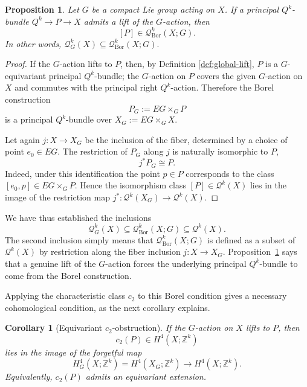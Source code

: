 \documentclass[11pt,a4paper]{article}
\numberwithin{equation}{section}
\newtheorem{prop}[definition]{Proposition}
\newtheorem{cor}[definition]{Corollary}
\theoremstyle{named}
\begin{document}
\begin{prop}
\label{prop:lifting-implies-borel}
Let \(G\) be a compact Lie group acting on \(X\). If a principal \(Q^k\)-bundle $Q^k\longrightarrow P\longrightarrow X$
admits a lift of the \(G\)-action, then
\[
[P]\in \mathcal Q^k_{\mathrm{Bor}}(X;G).
\]
In other words, $\mathcal Q^k_G(X)\subseteq \mathcal Q^k_{\mathrm{Bor}}(X;G).$
\end{prop}
 \begin{proof}
If the \(G\)-action lifts to \(P\), then, by Definition \ref{def:global-lift}, \(P\) is a \(G\)-equivariant principal \(Q^k\)-bundle; the \(G\)-action on \(P\) covers the given \(G\)-action on \(X\) and commutes with the principal right \(Q^k\)-action. Therefore the Borel construction
\[
P_G:=EG\times_G P
\]
is a principal \(Q^k\)-bundle over $X_G:=EG\times_G X$.

Let again $j:X\longrightarrow X_G$
be the inclusion of the fiber, determined by a choice of point \(e_0\in EG\). The restriction of \(P_G\) along \(j\) is naturally isomorphic to \(P\),
\[
j^*P_G\cong P.
\]
Indeed, under this identification the point \(p\in P\) corresponds to the class \([e_0,p]\in EG\times_G P\). Hence the isomorphism class \([P]\in\mathcal Q^k(X)\) lies in the image of
the restriction map $j^*:\mathcal{Q}^k(X_G)
\longrightarrow
\mathcal{Q}^k(X)$.
\end{proof}

\noindent We have thus established the inclusions
\[
\mathcal Q^k_G(X)\subseteq \mathcal Q^k_{\mathrm{Bor}}(X;G)\subseteq \mathcal Q^k(X).
\]
The second inclusion simply means that \(\mathcal Q^k_{\mathrm{Bor}}(X;G)\) is defined as a subset of \(\mathcal Q^k(X)\) by restriction along the fiber inclusion \(j:X\to X_G\). Proposition~\ref{prop:lifting-implies-borel} says that a genuine lift of the \(G\)-action forces the underlying principal \(Q^k\)-bundle to come from the Borel construction.

\noindent Applying the characteristic class \(c_2\) to this Borel condition gives a necessary cohomological condition, as the next corollary explains.

\begin{cor}[Equivariant \(c_2\)-obstruction]
\label{cor:c2-obstruction-global}
If the \(G\)-action on \(X\) lifts to \(P\), then
\[
c_2(P)\in H^4(X;\mathbb Z^k)
\]
lies in the image of the forgetful map
\[
H_G^4(X;\mathbb Z^k)
=
H^4(X_G;\mathbb Z^k)
\longrightarrow
H^4(X;\mathbb Z^k).
\]
Equivalently, \(c_2(P)\) admits an equivariant extension.
\end{cor}
\end{document}
